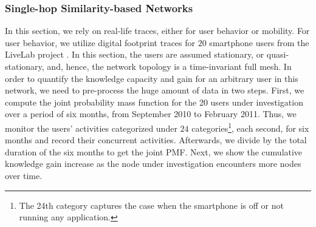 \documentclass[conference]{IEEEtran}
\theoremstyle{definition}
\begin{document}
\subsubsection{Single-hop Similarity-based Networks}
\vspace{-0.2 cm}
%
%
In this section, we rely on real-life traces, either for user behavior or mobility. For user behavior, we utilize digital footprint traces for $20$ smartphone users from the LiveLab project \cite{data}. In this section, the users are assumed stationary, or quasi-stationary, and, hence, the network topology is a time-invariant full mesh. In order to quantify the knowledge capacity and gain for an arbitrary user in this network, we need to pre-process the huge amount of data in two steps. First, we compute the joint probability mass function for the 20 users under investigation over a period of six months, from September 2010 to February 2011. Thus, we monitor the users' activities categorized under $24$ categories\footnote{The 24th category captures the case when the smartphone is off or not running any application.}, each second, for six months and record their concurrent activities. Afterwards, we divide by the total duration of the six months to get the joint PMF. Next, we show the cumulative knowledge gain increase as the node under investigation encounters more nodes over time.
\end{document}
